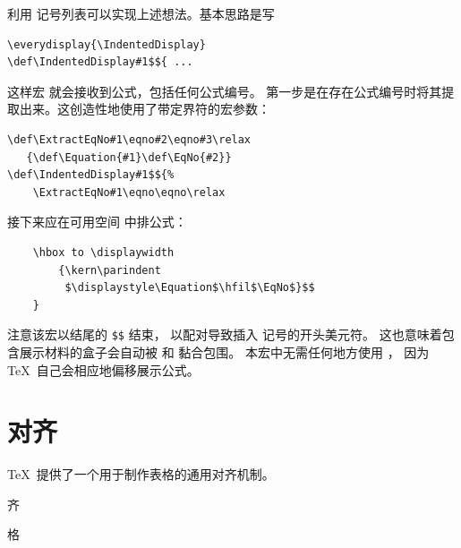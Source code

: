 \documentclass[a4paper]{rapport3}
\def\term#1\par{\index{#1}}
\begin{document}
利用  记号列表可以实现上述想法。基本思路是写
\begin{verbatim}
\everydisplay{\IndentedDisplay}
\def\IndentedDisplay#1$${ ...
\end{verbatim}
这样宏  就会接收到公式，包括任何公式编号。
第一步是在存在公式编号时将其提取出来。这创造性地使用了带定界符的宏参数：
\begin{verbatim}
\def\ExtractEqNo#1\eqno#2\eqno#3\relax
   {\def\Equation{#1}\def\EqNo{#2}}
\def\IndentedDisplay#1$${%
    \ExtractEqNo#1\eqno\eqno\relax
\end{verbatim}
接下来应在可用空间  中排公式：
\begin{verbatim}
    \hbox to \displaywidth
        {\kern\parindent
         $\displaystyle\Equation$\hfil$\EqNo$}$$
    }
\end{verbatim}
注意该宏以结尾的 \verb>$$> 结束，
以配对导致插入  记号的开头美元符。
这也意味着包含展示材料的盒子会自动被
 和  黏合包围。
本宏中无需任何地方使用 ，
因为 \TeX\ 自己会相应地偏移展示公式。





\endofchapter
\chapter{对齐}\label{align}

\TeX\ 提供了一个用于制作表格的通用对齐机制。
\term 对齐\par\term 表格\par
\end{document}
